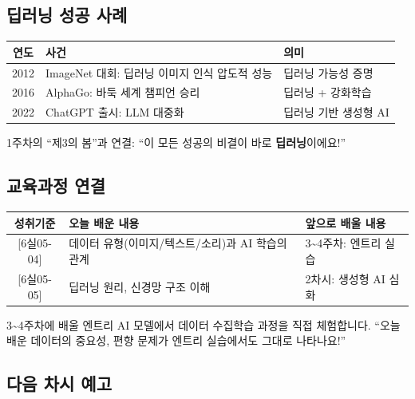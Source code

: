 \documentclass[11pt,a4paper]{article}
\begin{document}
\subsection{딥러닝 성공 사례}

\begin{center}
\begin{tabular}{|c|p{5.5cm}|p{4.5cm}|}
\hline
\rowcolor{tableheader}
\textbf{연도} & \textbf{사건} & \textbf{의미} \\
\hline
2012 & ImageNet 대회: 딥러닝 이미지 인식 압도적 성능 & 딥러닝 가능성 증명 \\
\hline
2016 & AlphaGo: 바둑 세계 챔피언 승리 & 딥러닝 + 강화학습 \\
\hline
2022 & ChatGPT 출시: LLM 대중화 & 딥러닝 기반 생성형 AI \\
\hline
\end{tabular}
\end{center}

\begin{scriptbox}
1주차의 ``제3의 봄''과 연결: ``이 모든 성공의 비결이 바로 \textbf{딥러닝}이에요!''
\end{scriptbox}

\subsection{교육과정 연결}

\begin{center}
\begin{tabular}{|c|p{4.5cm}|p{4.5cm}|}
\hline
\rowcolor{tableheader}
\textbf{성취기준} & \textbf{오늘 배운 내용} & \textbf{앞으로 배울 내용} \\
\hline
{[6실05-04]} & 데이터 유형(이미지/텍스트/소리)과 AI 학습의 관계 & 3\textasciitilde4주차: 엔트리 실습 \\
\hline
{[6실05-05]} & 딥러닝 원리, 신경망 구조 이해 & 2차시: 생성형 AI 심화 \\
\hline
\end{tabular}
\end{center}

\begin{keybox}
3\textasciitilde4주차에 배울 엔트리 AI 모델에서 데이터 수집\textperiodcentered{}학습 과정을 직접 체험합니다. ``오늘 배운 데이터의 중요성, 편향 문제가 엔트리 실습에서도 그대로 나타나요!''
\end{keybox}

\subsection{ 다음 차시 예고}
\end{document}
